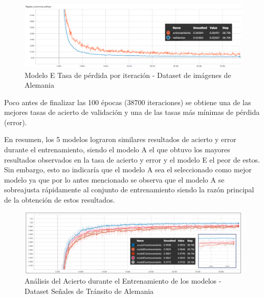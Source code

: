 			\begin{figure}[H]
				\begin{center}
				\includegraphics[width=1\textwidth]{images/desarrollo/trainResults/german/model7Loss_1} 
				\end{center}
				\begin{center}
				\caption{\small{Modelo E Tasa de pérdida por iteración - Dataset de imágenes de Alemania}}
				
				{\small{\fontsize{10}{16.8}\selectfont {Fuente: Elaboración propia}}}
				\end{center}
				\vspace{-1.5em}
			\end{figure}
		
			Poco antes de finalizar las 100 épocas (38700 iteraciones) se obtiene una de las mejores tasas de acierto de validación y una de las tasas más mínimas de pérdida (error).
		
		\newpage
		En resumen, los 5 modelos lograron similares resultados de acierto y error durante el entrenamiento, siendo el modelo A el que obtuvo los mayores resultados observados en la tasa de acierto y error y el modelo E el peor de estos. Sin embargo, esto no indicaría que el modelo A sea el seleccionado como mejor modelo ya que por lo antes mencionado se observa que el modelo A se sobreajusta rápidamente al conjunto de entrenamiento siendo la razón principal de la obtención de estos resultados.

			\begin{figure}[H]
				\includegraphics[width=1\textwidth, height=\textheight,keepaspectratio]{images/desarrollo/trainResults/germanSummary_entreAcierto} 
				\begin{center}
				\caption{\small{Análisis del Acierto durante el Entrenamiento de los modelos - Dataset Señales de Tránsito de Alemania}}
				
				{\small{\fontsize{10}{16.8}\selectfont {Fuente: Elaboración propia}}}
				\end{center}
				\vspace{-1.5em}
			\end{figure}	

